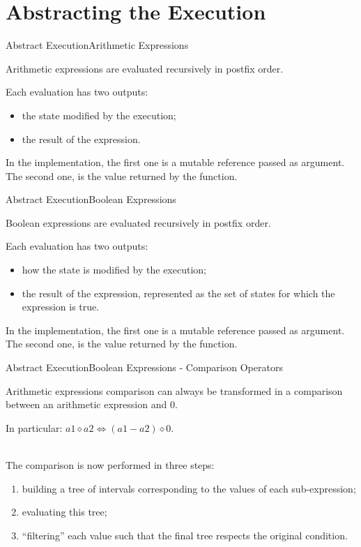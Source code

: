 \documentclass{beamer}
\begin{document}
\section{Abstracting the Execution}

\begin{frame}{Abstract Execution}{Arithmetic Expressions}

    Arithmetic expressions are evaluated recursively in postfix order.

    Each evaluation has two outputs:
    \begin{itemize}
        \item the state modified by the execution;
        \item the result of the expression.
    \end{itemize}

    In the implementation, the first one is a mutable reference passed as argument.
    The second one, is the value returned by the function.

\end{frame}

\begin{frame}{Abstract Execution}{Boolean Expressions}

    Boolean expressions are evaluated recursively in postfix order.

    Each evaluation has two outputs:
    \begin{itemize}
        \item how the state is modified by the execution;
        \item the result of the expression, represented as the set of states for which the expression is true.
    \end{itemize}

    In the implementation, the first one is a mutable reference passed as argument.
    The second one, is the value returned by the function.

\end{frame}

\begin{frame}{Abstract Execution}{Boolean Expressions - Comparison Operators}

    Arithmetic expressions comparison can always be transformed in a comparison between an arithmetic expression and $0$.

    In particular: $\textit{a1} \diamond \textit{a2} \iff (\textit{a1} - \textit{a2}) \diamond 0$.

    ~\\
    The comparison is now performed in three steps:
    \begin{enumerate}
        \item building a tree of intervals corresponding to the values of each sub-expression;
        \item evaluating this tree;
        \item ``filtering'' each value such that the final tree respects the original condition.
    \end{enumerate}

\end{frame}
\end{document}
